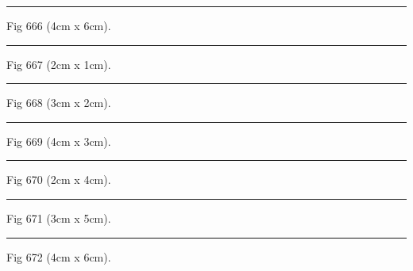 \documentclass[a4paper,11pt]{article}
\begin{document}
\begin{swarmwrap}%
  \begin{minipage}[t]{4cm}
    \centering
    \rule{\linewidth}{6cm}
    {\footnotesize Fig 666 (4cm x 6cm).}
  \end{minipage}%
\end{swarmwrap}%
\swarmwrapnext
\lipsum[66]%

\begin{swarmwrap}%
  \begin{minipage}[t]{2cm}
    \centering
    \rule{\linewidth}{1cm}
    {\footnotesize Fig 667 (2cm x 1cm).}
  \end{minipage}%
\end{swarmwrap}%
\swarmwrapnext
\lipsum[67]%

\begin{swarmwrap}%
  \begin{minipage}[t]{3cm}
    \centering
    \rule{\linewidth}{2cm}
    {\footnotesize Fig 668 (3cm x 2cm).}
  \end{minipage}%
\end{swarmwrap}%
\swarmwrapnext
\lipsum[68]%

\begin{swarmwrap}%
  \begin{minipage}[t]{4cm}
    \centering
    \rule{\linewidth}{3cm}
    {\footnotesize Fig 669 (4cm x 3cm).}
  \end{minipage}%
\end{swarmwrap}%
\swarmwrapnext
\lipsum[69]%

\begin{swarmwrap}%
  \begin{minipage}[t]{2cm}
    \centering
    \rule{\linewidth}{4cm}
    {\footnotesize Fig 670 (2cm x 4cm).}
  \end{minipage}%
\end{swarmwrap}%
\swarmwrapnext
\lipsum[70]%

\begin{swarmwrap}%
  \begin{minipage}[t]{3cm}
    \centering
    \rule{\linewidth}{5cm}
    {\footnotesize Fig 671 (3cm x 5cm).}
  \end{minipage}%
\end{swarmwrap}%
\swarmwrapnext
\lipsum[71]%

\begin{swarmwrap}%
  \begin{minipage}[t]{4cm}
    \centering
    \rule{\linewidth}{6cm}
    {\footnotesize Fig 672 (4cm x 6cm).}
  \end{minipage}%
\end{swarmwrap}%
\swarmwrapnext
\lipsum[72]%
\end{document}
